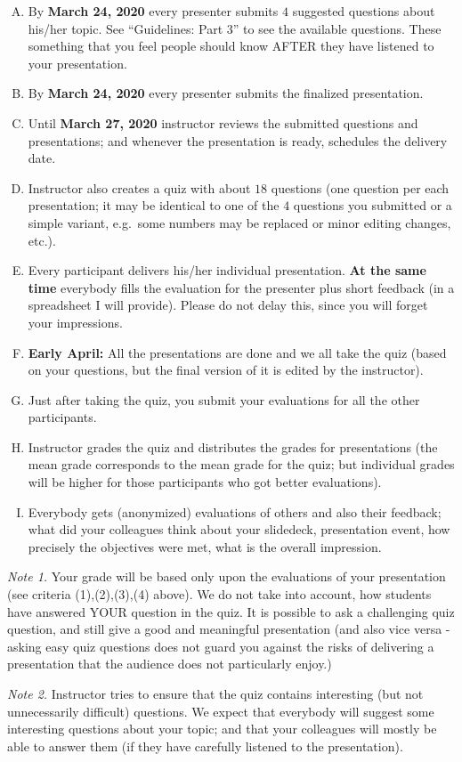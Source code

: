 \documentclass[jou]{apa6}
\begin{document}
\begin{enumerate}[(A)]
\item By {\bf March 24, 2020} every presenter submits $4$ suggested questions about his/her topic. 
See ``Guidelines: Part 3'' to see the available questions. 
These something that you feel people should know AFTER they have listened to your presentation. 
\item By {\bf March 24, 2020} every presenter submits the finalized presentation.
\item Until {\bf March 27, 2020} instructor reviews the submitted questions and presentations; 
and whenever the presentation is ready, schedules the delivery date.
\item Instructor also creates a quiz with about $18$ questions (one question per each presentation; 
it may be identical to one of the $4$ questions you submitted or a simple variant, e.g.\ 
some numbers may be replaced or minor editing changes, etc.).
\item Every participant delivers his/her individual presentation. 
{\bf At the same time} everybody fills the evaluation for the presenter plus short feedback (in a spreadsheet I will provide).
Please do not delay this, since you will forget your impressions.
\item {\bf Early April:} All the presentations are done and we all take the quiz (based on your questions, 
but the final version of it is edited by the instructor). 
\item Just after taking the quiz, you submit your evaluations for all the other participants.
\item Instructor grades the quiz and distributes the grades for presentations (the mean grade corresponds
to the mean grade for the quiz; but individual grades will be higher for those participants who got better 
evaluations). 
\item Everybody gets (anonymized) evaluations of others and also their feedback; what did your colleagues
think about your slidedeck, presentation event, how precisely the objectives were met, what is the overall impression. 
\end{enumerate}

{\em Note 1.} Your grade will be based only upon the evaluations of your presentation
(see criteria (1),(2),(3),(4) above). We do not take into account, how students have answered YOUR question in the quiz.
It is possible to ask a challenging quiz question, and still give a good and meaningful presentation
(and also vice versa - asking easy quiz questions does not guard you against the risks of delivering 
a presentation that the audience does not particularly enjoy.)

{\em Note 2.} Instructor tries to ensure that the quiz contains interesting (but not unnecessarily difficult) questions.
We expect that everybody will suggest some interesting questions about your topic; 
and that your colleagues will mostly be able to answer them (if they have carefully listened to the presentation). 
 
\end{document}
